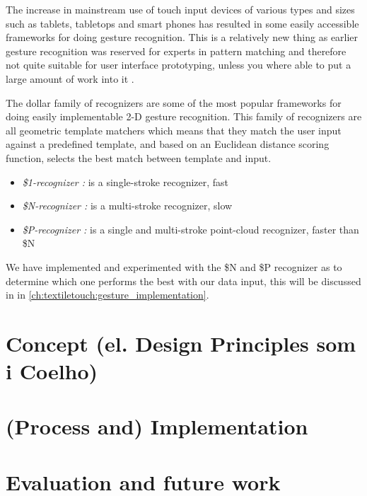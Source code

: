 The increase in mainstream use of touch input devices of various types and sizes such as tablets, tabletops and smart phones has resulted in some easily accessible frameworks for doing gesture recognition.
This is a relatively new thing as earlier gesture recognition was reserved for experts in pattern matching and therefore not quite suitable for user interface prototyping, unless you where able to put a large amount of work into it \citep{wobbrock2007gestures}.  


The dollar family of recognizers \citep{anthony2010lightweight,vatavu2012gestures,wobbrock2007gestures} are some of the most popular frameworks for doing easily implementable 2-D gesture recognition.
This family of recognizers are all geometric template matchers which means that they match the user input against a predefined template, and based on an Euclidean distance scoring function, selects the best match between template and input.
\begin{itemize}
  \item \emph{\$1-recognizer \citep{wobbrock2007gestures}:} is a single-stroke recognizer, fast
  \item \emph{\$N-recognizer \citep{anthony2010lightweight}:} is a multi-stroke recognizer, slow
  \item \emph{\$P-recognizer \citep{vatavu2012gestures}:} is a single and multi-stroke point-cloud recognizer, faster than \$N
\end{itemize}
We have implemented and experimented with the \$N and \$P recognizer as to determine which one performs the best with our data input, this will be discussed in  in \ref{ch:textiletouch:gesture_implementation}.


\section{Concept (el. Design Principles som i Coelho)}


\section{(Process and) Implementation}


\section{Evaluation and future work}
